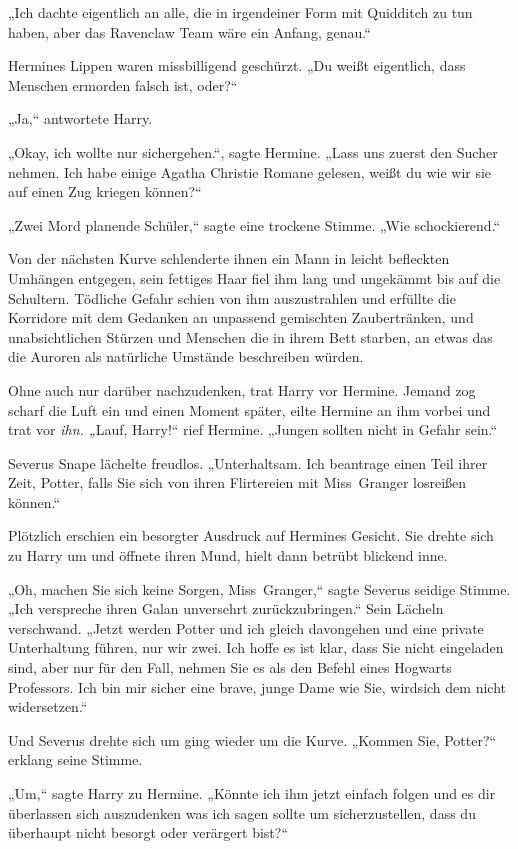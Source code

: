 {„Ich dachte eigentlich an alle, die in irgendeiner Form mit Quidditch zu tun haben, aber das Ravenclaw Team wäre ein Anfang, genau.“

Hermines Lippen waren missbilligend geschürzt. „Du weißt eigentlich, dass Menschen ermorden falsch ist, oder?“

„Ja,“ antwortete Harry.

„Okay, ich wollte nur sichergehen.“, sagte Hermine. „Lass uns zuerst den Sucher nehmen. Ich habe einige Agatha Christie Romane gelesen, weißt du wie wir sie auf einen Zug kriegen können?“

„Zwei Mord planende Schüler,“ sagte eine trockene Stimme. „Wie schockierend.“

Von der nächsten Kurve schlenderte ihnen ein Mann in leicht befleckten Umhängen entgegen, sein fettiges Haar fiel ihm lang und ungekämmt bis auf die Schultern. Tödliche Gefahr schien von ihm auszustrahlen und erfüllte die Korridore mit dem Gedanken an unpassend gemischten Zaubertränken, und unabsichtlichen Stürzen und Menschen die in ihrem Bett starben, an etwas das die Auroren als natürliche Umstände beschreiben würden.

Ohne auch nur darüber nachzudenken, trat Harry vor Hermine. Jemand zog scharf die Luft ein und einen Moment später, eilte Hermine an ihm vorbei und trat vor \emph{ihn. „}Lauf, Harry!“ rief Hermine. „Jungen sollten nicht in Gefahr sein.“

Severus Snape lächelte freudlos. „Unterhaltsam. Ich beantrage einen Teil ihrer Zeit, Potter, falls Sie sich von ihren Flirtereien mit Miss~Granger losreißen können.“

Plötzlich erschien ein besorgter Ausdruck auf Hermines Gesicht. Sie drehte sich zu Harry um und öffnete ihren Mund, hielt dann betrübt blickend inne.

„Oh, machen Sie sich keine Sorgen, Miss~Granger,“ sagte Severus seidige Stimme. „Ich verspreche ihren Galan unversehrt zurückzubringen.“ Sein Lächeln verschwand. „Jetzt werden Potter und ich gleich davongehen und eine private Unterhaltung führen, nur wir zwei. Ich hoffe es ist klar, dass Sie nicht eingeladen sind, aber nur für den Fall, nehmen Sie es als den Befehl eines Hogwarts Professors. Ich bin mir sicher eine brave, junge Dame wie Sie, wirdsich dem nicht widersetzen.“

Und Severus drehte sich um ging wieder um die Kurve. „Kommen Sie, Potter?“ erklang seine Stimme.

„Um,“ sagte Harry zu Hermine. „Könnte ich ihm jetzt einfach folgen und es dir überlassen sich auszudenken was ich sagen sollte um sicherzustellen, dass du überhaupt nicht besorgt oder verärgert bist?“

}
